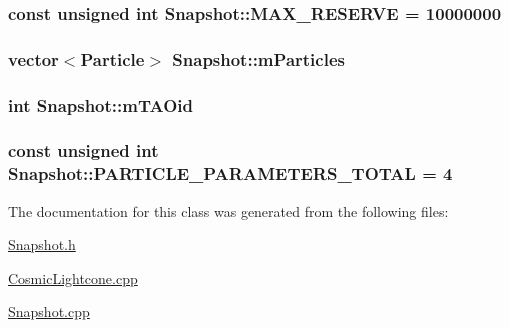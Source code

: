 \subsubsection[{M\+A\+X\+\_\+\+R\+E\+S\+E\+R\+V\+E}]{\setlength{\rightskip}{0pt plus 5cm}const unsigned int Snapshot\+::\+M\+A\+X\+\_\+\+R\+E\+S\+E\+R\+V\+E = 10000000\hspace{0.3cm}{\ttfamily [static]}}\label{classSnapshot_a7e222bfbf93befc22df564ff28feed1b}
\hypertarget{classSnapshot_a96ba382e41a4fa8bd4de0e3e999be8f1}{}
\subsubsection[{m\+Particles}]{\setlength{\rightskip}{0pt plus 5cm}vector$<${\bf Particle}$>$ Snapshot\+::m\+Particles}\label{classSnapshot_a96ba382e41a4fa8bd4de0e3e999be8f1}
\hypertarget{classSnapshot_a819b00f164775a0ec42023903ebb20ee}{}
\subsubsection[{m\+T\+A\+Oid}]{\setlength{\rightskip}{0pt plus 5cm}int Snapshot\+::m\+T\+A\+Oid}\label{classSnapshot_a819b00f164775a0ec42023903ebb20ee}
\hypertarget{classSnapshot_a651f859c63b47954020a0c08340892cc}{}
\subsubsection[{P\+A\+R\+T\+I\+C\+L\+E\+\_\+\+P\+A\+R\+A\+M\+E\+T\+E\+R\+S\+\_\+\+T\+O\+T\+A\+L}]{\setlength{\rightskip}{0pt plus 5cm}const unsigned int Snapshot\+::\+P\+A\+R\+T\+I\+C\+L\+E\+\_\+\+P\+A\+R\+A\+M\+E\+T\+E\+R\+S\+\_\+\+T\+O\+T\+A\+L = 4\hspace{0.3cm}{\ttfamily [static]}}\label{classSnapshot_a651f859c63b47954020a0c08340892cc}


The documentation for this class was generated from the following files\+:\begin{DoxyCompactItemize}
\item 
\hyperlink{Snapshot_8h}{Snapshot.\+h}\item 
\hyperlink{CosmicLightcone_8cpp}{Cosmic\+Lightcone.\+cpp}\item 
\hyperlink{Snapshot_8cpp}{Snapshot.\+cpp}\end{DoxyCompactItemize}
